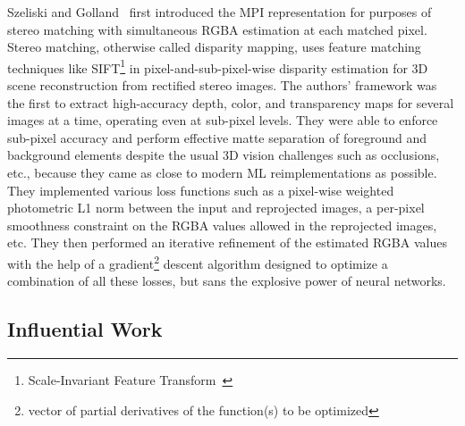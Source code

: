Szeliski and Golland~\cite{szeliski_stereo_1999} first introduced the MPI representation for purposes of stereo matching with simultaneous RGBA estimation at each matched pixel. Stereo matching, otherwise called disparity mapping, uses feature matching techniques like SIFT\footnote{Scale-Invariant Feature Transform~\cite{lowe_distinctive_2004}} in pixel-and-sub-pixel-wise disparity estimation for 3D scene reconstruction from rectified stereo images. The authors' framework was the first to extract high-accuracy depth, color, and transparency maps for several images at a time, operating even at sub-pixel levels. They were able to enforce sub-pixel accuracy and perform effective matte separation of foreground and background elements despite the usual 3D vision challenges such as occlusions, etc., because they came as close to modern ML reimplementations as possible. They implemented various loss functions such as a pixel-wise weighted photometric L1 norm between the input and reprojected images, a per-pixel smoothness constraint on the RGBA values allowed in the reprojected images, etc. They then performed an iterative refinement of the estimated RGBA values with the help of a gradient\footnote{vector of partial derivatives of the function(s) to be optimized} descent algorithm designed to optimize a combination of all these losses, but sans the explosive power of neural networks.

\subsection{Influential Work}\label{subsec:influential-work}

